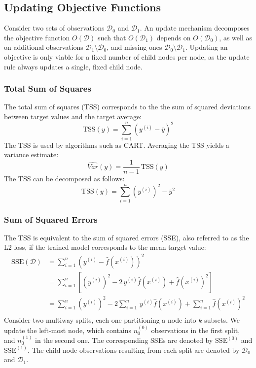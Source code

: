 \documentclass[a4paper, 11pt]{article}
\begin{document}
\subsection{Updating Objective Functions}

Consider two sets of observations $\mathcal{D}_0$ and $\mathcal{D}_1$. An update mechanism decomposes the objective function $O(\mathcal{D})$ such that $O(\mathcal{D}_1)$ depends on $O(\mathcal{D}_0)$, as well as on additional observations $\mathcal{D}_1 \setminus \mathcal{D}_0$, and missing ones $\mathcal{D}_0 \setminus \mathcal{D}_1$. Updating an objective is only viable for a fixed number of child nodes per node, as the update rule always updates a single, fixed child node.

\subsubsection{Total Sum of Squares}

The total sum of squares (TSS) corresponds to the the sum of squared deviations between target values and the target average:
$$
\text{TSS}(y) = \sum_{i = 1}^{n} \left(y^{(i)} - \overline{y}\right)^2
$$
The TSS is used by algorithms such as CART. Averaging the TSS yields a variance estimate:
$$
\widehat{Var}(y) = \frac{1}{n-1}\, \text{TSS}(y)
$$
The TSS can be decomposed as follows:
$$
\text{TSS}(y) = \sum_{i = 1}^{n} \left(y^{(i)}\right)^2 - \overline{y}^2
$$

\subsubsection{Sum of Squared Errors}

The TSS is equivalent to the sum of squared errors (SSE), also referred to as the L2 loss, if the trained model corresponds to the mean target value:
\begin{align*}
\text{SSE}(\mathcal{D}) &= \sum_{i = 1}^{n} \left(y^{(i)} - \hat{f}\left(x^{(i)}\right)\right)^2 \\
&= \sum_{i = 1}^{n} \left[\left(y^{(i)}\right)^2 - 2\, y^{(i)} \hat{f}\left(x^{(i)}\right) + \hat{f}\left(x^{(i)}\right)^2\right] \\
&= \sum_{i = 1}^{n} \left(y^{(i)}\right)^2 - 2 \sum_{i = 1}^{n} \,y^{(i)} \hat{f}\left(x^{(i)}\right) + \sum_{i = 1}^{n} \hat{f}\left(x^{(i)}\right)^2 \\
\end{align*}
Consider two multiway splits, each one partitioning a node into $k$ subsets. We update the left-most node, which contains $n_0^{(0)}$ observations in the first split, and $n_0^{(1)}$ in the second one. The corresponding SSEs are denoted by $\text{SSE}^{(0)}$ and $\text{SSE}^{(1)}$. The child node observations resulting from each split are denoted by $\mathcal{D}_0$ and $\mathcal{D}_1$.
\end{document}
